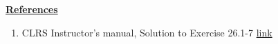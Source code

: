 \documentclass[12pt]{article}
\begin{document}
\begin{enumerate}[1.]
\begin{enumerate}[a)]
        \bigskip

        \underline{\textbf{References}}

        \bigskip

        \begin{enumerate}[1)]
            \item CLRS Instructor's manual, Solution to Exercise 26.1-7 \href{https://cdn.manesht.ir/19908___Introduction%20to%20Algorithms.pdf}{link}
        \end{enumerate}
    \end{enumerate}


\end{enumerate}
\end{document}
